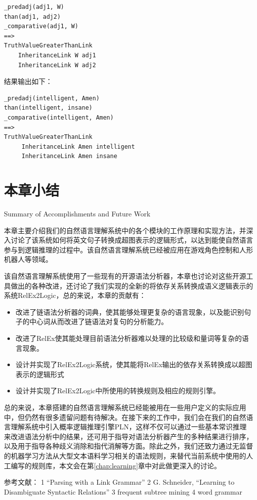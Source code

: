 {\tt\begin{small}\begin{lstlisting}
_predadj(adj1, W)
than(adj1, adj2)
_comparative(adj1, W)
==>
TruthValueGreaterThanLink
    InheritanceLink W adj1
    InheritanceLink W adj2
 \end{lstlisting}\end{small}}
 
结果输出如下：

 {\tt\begin{small}\begin{lstlisting}
_predadj(intelligent, Amen)
than(intelligent, insane)
_comparative(intelligent, Amen)
==>
TruthValueGreaterThanLink
     InheritanceLink Amen intelligent
     InheritanceLink Amen insane
 \end{lstlisting}\end{small}}

\section{本章小结}{Summary of Accomplishments and Future Work}

本章主要介绍我们的自然语言理解系统中的各个模块的工作原理和实现方法，并深入讨论了该系统如何将英文句子转换成超图表示的逻辑形式，以达到能使自然语言参与到逻辑推理的过程中。该自然语言理解系统已经被应用在游戏角色控制和人形机器人等领域。

该自然语言理解系统使用了一些现有的开源语法分析器，本章也讨论对这些开源工具做出的各种改进，还讨论了我们实现的全新的将依存关系转换成语义逻辑表示的系统RelEx2Logic，总的来说，本章的贡献有：

\begin{itemize}
\item 改进了链语法分析器的词典，使其能够处理更复杂的语言现象，以及能识别句子的中心词从而改进了链语法对复句的分析能力。
\item 改进了RelEx使其能处理目前语法分析器难以处理的比较级和量词等复杂的语言现象。
\item 设计并实现了RelEx2Logic系统，使其能将RelEx输出的依存关系转换成以超图表示的逻辑形式
\item 设计并实现了RelEx2Logic中所使用的转换规则及相应的规则引擎。
\end{itemize}

总的来说，本章搭建的自然语言理解系统已经能被用在一些用户定义的实际应用中，但仍然有很多遗留问题有待解决。在接下来的工作中，我们会在我们的自然语言理解系统中引入概率逻辑推理引擎PLN，这样不仅可以通过一些基本常识推理来改进语法分析中的结果，还可用于指导对语法分析器产生的多种结果进行排序，以及用于指导各种歧义消除和指代消解等方面。除此之外，我们还致力通过无监督的机器学习方法从大型文本语料学习相关的语法规则，来替代当前系统中使用的人工编写的规则库，本文会在第\ref{chap:learning}章中对此做更深入的讨论。


参考文献：
1 “Parsing with a Link Grammar”
2 G. Schneider, ``Learning to Disambiguate Syntactic
Relations''
3 frequent subtree mining
4 word grammar
